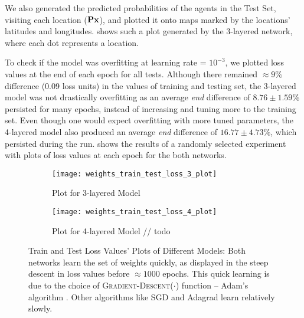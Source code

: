 We also generated the predicted probabilities of the agents in the Test Set, visiting each location ($\mathbf{P}\mathbf{x}$), and plotted it onto maps marked by the locations' latitudes and longitudes.  shows such a plot generated by the 3-layered network, where each dot represents a location.

To check if the model was overfitting at learning rate = $10^{-3}$, we plotted loss values at the end of each epoch for all tests. Although there remained $\approx 9\%$ difference (0.09 loss units) in the values of training and testing set, the 3-layered model was not drastically overfitting as an average \textit{end} difference of $8.76 \pm 1.59$\% persisted for many epochs, instead of increasing and tuning more to the training set. Even though one would expect overfitting with more tuned parameters, the 4-layered model also  produced an average \textit{end} difference of $16.77 \pm 4.73\%$, which persisted during the run.  shows the results of a randomly selected experiment with plots of loss values at each epoch for the both networks.
\begin{figure}[!htbp]
    \centering
    \begin{subfigure}{.49\textwidth}
        \centering
        \texttt{[image: weights\_train\_test\_loss\_3\_plot]}
        \caption{Plot for 3-layered Model}
        \label{fig:Plot for 3-layered Model}
    \end{subfigure}
    \begin{subfigure}{.49\textwidth}
        \centering
        \texttt{[image: weights\_train\_test\_loss\_4\_plot]}
        \caption{Plot for 4-layered Model // todo}
        \label{fig:Plot for 4-layered Model}
    \end{subfigure}
    \caption[Train and Test Loss Values' Plots of Different Models]{Train and Test Loss Values' Plots of Different Models: Both networks learn the set of weights quickly, as displayed in the steep descent in loss values before $\approx 1000$ epochs. This quick learning is due to the choice of \textsc{Gradient-Descent}($\cdot$) function -- Adam's algorithm \cite{Adam}. Other algorithms like SGD \cite{SGD} and Adagrad \cite{Adagrad} learn relatively slowly.}
    \label{fig:Train & Test Loss Values' Plots of Different Models}
\end{figure}

